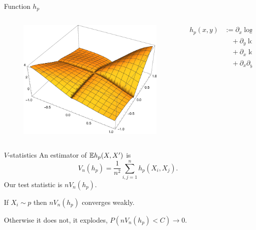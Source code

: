 \documentclass{beamer}
\begin{document}
\begin{frame}{Function $h_p$}
\
 \begin{columns}
        \begin{column}{.5\textwidth}
        \vspace{1cm}
        \begin{figure}
\advance\rightskip-2cm

           \includegraphics[width=\textwidth]{./img/h.pdf} 
        \end{figure}
        \end{column}
        \begin{column}{.5\textwidth}
        \vspace{-2cm}
           \begin{align*}
h_{p}(x,y) & := \partial_{x} \log p(x) \partial_{x} \log p(y) k(x,y)\\
 & \quad+\partial_{y}\log p(y) \partial_{x}  k(x,y)\\
 & \quad+\partial_{x}\log p(x) \partial_{y}k(x,y)\\
 & \quad+\partial_{x} \partial_{y} k(x,y),
\end{align*}
        \end{column}
    \end{columns}
 

 \end{frame}
 
 \begin{frame}{$V$-statistics}
An estimator of $\mathbb{E} h_p(X,X')$ is
\[
 V_n(h_p) = \frac {1} {n^2} \sum_{i,j=1}^n h_p(X_i,X_j).
\]
Our test statistic is $ n V_n(h_p)$.

If $X_i \sim p$ then $ n V_n(h_p)$  converges weakly. 

Otherwise it does not,  it explodes, $P(n V_n(h_p) <C) \to 0$.
 \end{frame}
 
\end{document}
